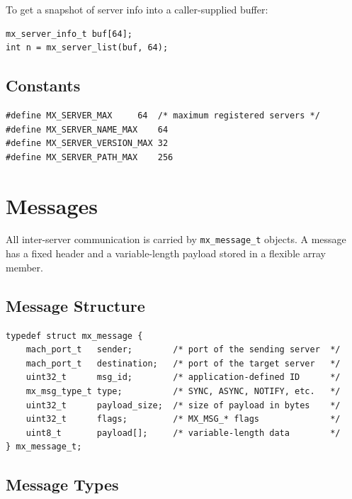 \documentclass[a4paper,11pt]{article}
\begin{document}
To get a snapshot of server info into a caller-supplied buffer:

\begin{lstlisting}
mx_server_info_t buf[64];
int n = mx_server_list(buf, 64);
\end{lstlisting}

\subsection{Constants}

\begin{lstlisting}
#define MX_SERVER_MAX     64  /* maximum registered servers */
#define MX_SERVER_NAME_MAX    64
#define MX_SERVER_VERSION_MAX 32
#define MX_SERVER_PATH_MAX    256
\end{lstlisting}

\section{Messages}

All inter-server communication is carried by \texttt{mx\_message\_t}
objects. A message has a fixed header and a variable-length payload
stored in a flexible array member.

\subsection{Message Structure}

\begin{lstlisting}
typedef struct mx_message {
    mach_port_t   sender;        /* port of the sending server  */
    mach_port_t   destination;   /* port of the target server   */
    uint32_t      msg_id;        /* application-defined ID      */
    mx_msg_type_t type;          /* SYNC, ASYNC, NOTIFY, etc.   */
    uint32_t      payload_size;  /* size of payload in bytes    */
    uint32_t      flags;         /* MX_MSG_* flags              */
    uint8_t       payload[];     /* variable-length data        */
} mx_message_t;
\end{lstlisting}

\subsection{Message Types}
\end{document}

